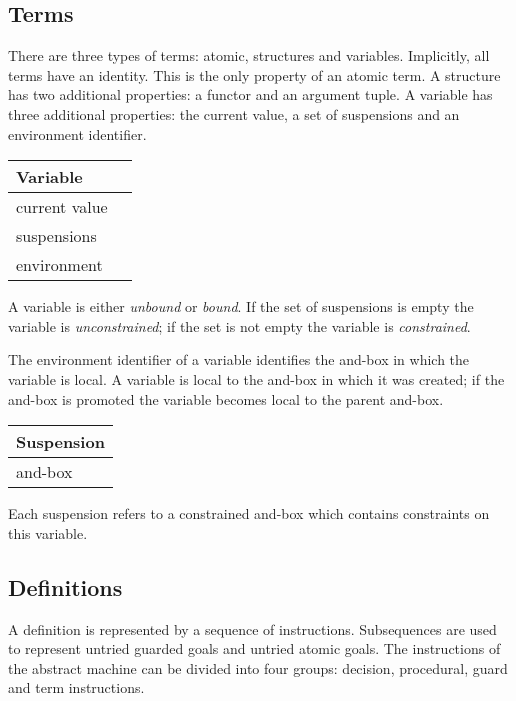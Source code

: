 \subsection*{Terms}

There are three types of terms: atomic, structures and
variables.  Implicitly, all terms have an identity.  This is the only
property of an atomic term. A structure has two additional properties:
a functor and an argument tuple. A variable has three additional
properties: the current value, a set of suspensions and an environment
identifier.

\begin{center} \begin{tabular}{|l|l|} \hline
Variable\\
\hline
\hline
current value\\
suspensions\\
environment\\
\hline
\end{tabular} \end{center}

A variable is either {\em unbound} or {\em bound}.  If the set of
suspensions is empty the variable is {\em unconstrained}; if the set
is not empty the variable is {\em constrained}.

The environment identifier of a variable identifies the and-box in
which the variable is local.  A variable is local to the and-box in
which it was created; if the and-box is promoted the variable becomes
local to the parent and-box.

\begin{center} \begin{tabular}{|l|}\hline
Suspension\\
\hline
\hline
and-box\\
\hline
\end{tabular} \end{center}

Each suspension refers to a constrained and-box which contains
constraints on this variable.

\subsection*{Definitions}

A definition is represented by a sequence of instructions.
Subsequences are used to represent untried guarded goals and untried
atomic goals. The instructions of the abstract machine can be divided
into four groups: decision, procedural, guard and term instructions.

